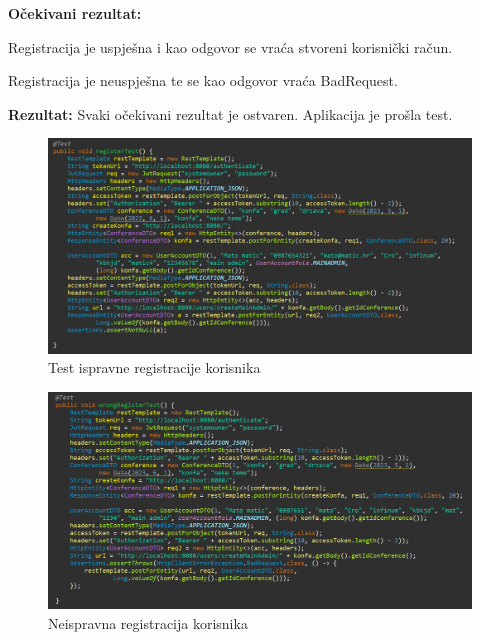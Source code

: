    \textbf{Očekivani rezultat:}
   \begin{packed_item}
   \item[] \begin{packed_enum}
				
				\item Registracija je uspješna i kao odgovor se vraća stvoreni korisnički račun.
    \item Registracija je neuspješna te se kao odgovor vraća BadRequest.
				
			\end{packed_enum}
   \end{packed_item}
   \textbf{Rezultat:} \text Svaki očekivani rezultat je ostvaren. \color{red} Aplikacija je prošla test. \color{black}

    \begin{figure}[H]
            \includegraphics[scale=0.55]{slike/register_test.png} %
			
			\centering
			\caption{Test ispravne registracije korisnika}
			\label{fig:ispravna registracija test}
			\end{figure}

    \begin{figure}[H]
            \includegraphics[scale=0.55]{slike/wrong_register_test.png} %
			
			\centering
			\caption{Neispravna registracija korisnika}
			\label{fig:neispravna registracija korisnika}
			\end{figure}
  



